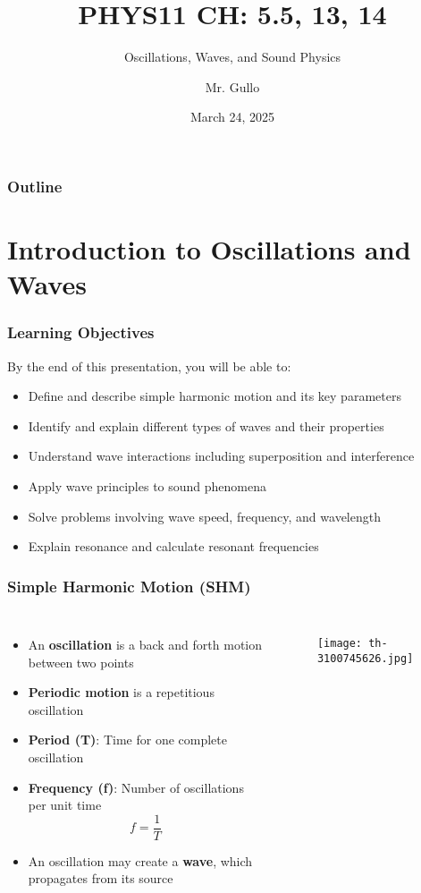 \documentclass{beamer}
\title[Waves \& Sound]{PHYS11 CH: 5.5, 13, 14}
\subtitle{Oscillations, Waves, and Sound Physics}
\author[Mr. Gullo]{Mr. Gullo}
\date[Mar 2025]{March 24, 2025}
\institute{Physics Department}
\begin{document}
\frame{\titlepage}

\begin{frame}
\frametitle{Outline}
\tableofcontents
\end{frame}

\section{Introduction to Oscillations and Waves}

\begin{frame}
\frametitle{Learning Objectives}
By the end of this presentation, you will be able to:
\begin{itemize}
\item Define and describe simple harmonic motion and its key parameters
\item Identify and explain different types of waves and their properties
\item Understand wave interactions including superposition and interference
\item Apply wave principles to sound phenomena
\item Solve problems involving wave speed, frequency, and wavelength
\item Explain resonance and calculate resonant frequencies
\end{itemize}
\end{frame}

\begin{frame}
\frametitle{Simple Harmonic Motion (SHM)}
\begin{columns}
\begin{itemize}
\item An \textbf{oscillation} is a back and forth motion between two points
\item \textbf{Periodic motion} is a repetitious oscillation
\item \textbf{Period (T)}: Time for one complete oscillation
\item \textbf{Frequency (f)}: Number of oscillations per unit time
\begin{equation}
f = \frac{1}{T}
\end{equation}
\item An oscillation may create a \textbf{wave}, which propagates from its source
\end{itemize}

\begin{figure}
    \centering
    \texttt{[image: th-3100745626.jpg]}
\end{figure}
\end{columns}
\end{frame}
\end{document}

